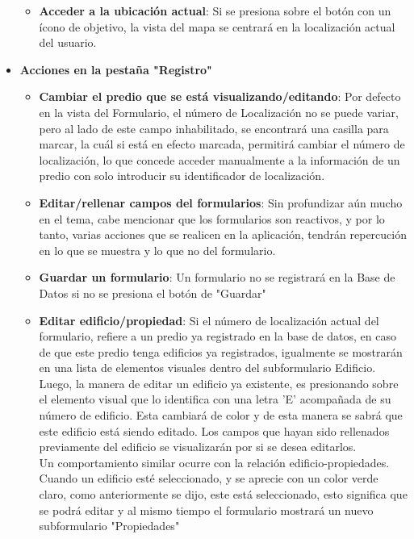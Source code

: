 \begin{itemize}
\begin{itemize}
              \item \textbf{Acceder a la ubicación actual}: Si se presiona sobre el botón con un ícono de objetivo, la vista del mapa se centrará en
                    la localización actual del usuario.
          \end{itemize}
    \item \textbf{Acciones en la pestaña "Registro"}
          \begin{itemize}
              \item \textbf{Cambiar el predio que se está visualizando/editando}: Por defecto en la vista del Formulario, el número de Localización no se puede variar,
                    pero al lado de este campo inhabilitado, se encontrará una casilla para marcar, la cuál si está en efecto marcada, permitirá cambiar el número de
                    localización, lo que concede acceder manualmente a la información de un predio con solo introducir su identificador de localización.
              \item \textbf{Editar/rellenar campos del formularios}: Sin profundizar aún mucho en el tema, cabe mencionar que los formularios son reactivos, y por lo tanto,
                    varias acciones que se realicen en la aplicación, tendrán repercución en lo que se muestra y lo que no del formulario.
              \item \textbf{Guardar un formulario}: Un formulario no se registrará en la Base de Datos si no se presiona el botón de "Guardar"
              \item \textbf{Editar edificio/propiedad}: Si el número de localización actual del formulario, refiere a un predio ya registrado en la base de datos, en caso de
                    que este predio tenga edificios ya registrados, igualmente se mostrarán en una lista de elementos visuales dentro del subformulario Edificio. Luego, la manera
                    de editar un edificio ya existente, es presionando sobre el elemento visual que lo identifica con una letra 'E' acompañada de su número de edificio. Esta cambiará
                    de color y de esta manera se sabrá que este edificio está siendo editado. Los campos que hayan sido rellenados previamente del edificio se visualizarán por si se
                    desea editarlos. \\
                    Un comportamiento similar ocurre con la relación edificio-propiedades. Cuando un edificio esté seleccionado, y se aprecie con un color verde claro, como
                    anteriormente se dijo, este está seleccionado, esto significa que se podrá editar y al mismo tiempo el formulario mostrará un nuevo subformulario "Propiedades"

\end{itemize}
\end{itemize}
